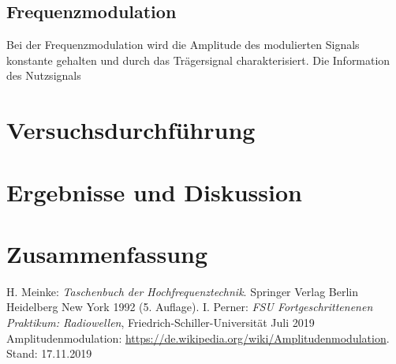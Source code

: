 \documentclass[a4paper,twoside,final]{article}
\begin{document}
\subsection{Frequenzmodulation}
Bei der Frequenzmodulation wird die Amplitude des modulierten Signals konstante gehalten und durch das Trägersignal charakterisiert. Die Information des Nutzsignals


\section{Versuchsdurchführung} \label{sec:Versuchsdurchführung}

\newpage
\section{Ergebnisse und Diskussion}


\section{Zusammenfassung}



\begin{thebibliography}{xxx}
	H. Meinke: \textit{Taschenbuch der Hochfrequenztechnik}. Springer Verlag Berlin Heidelberg New York 1992 (5. Auflage).
  I. Perner: \textit{FSU Fortgeschrittenenen Praktikum: Radiowellen}, Fried\-rich-Schil\-ler-Uni\-versi\-tät Juli 2019
  Amplitudenmodulation: \url{https://de.wikipedia.org/wiki/Amplitudenmodulation}. Stand: 17.11.2019
\end{thebibliography}
\end{document}
